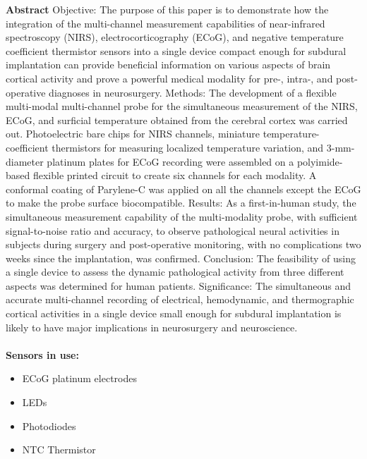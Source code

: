 \noindent
\textbf{Abstract} Objective: The purpose of this paper is to demonstrate how the integration of the multi-channel measurement capabilities of near-infrared spectroscopy (NIRS), electrocorticography (ECoG), and negative temperature coefficient thermistor sensors into a single device compact enough for subdural implantation can provide beneficial information on various aspects of brain cortical activity and prove a powerful medical modality for pre-, intra-, and post-operative diagnoses in neurosurgery. Methods: The development of a flexible multi-modal multi-channel probe for the simultaneous measurement of the NIRS, ECoG, and surficial temperature obtained from the cerebral cortex was carried out. Photoelectric bare chips for NIRS channels, miniature temperature-coefficient thermistors for measuring localized temperature variation, and 3-mm-diameter platinum plates for ECoG recording were assembled on a polyimide-based flexible printed circuit to create six channels for each modality. A conformal coating of Parylene-C was applied on all the channels except the ECoG to make the probe surface biocompatible. Results: As a first-in-human study, the simultaneous measurement capability of the multi-modality probe, with sufficient signal-to-noise ratio and accuracy, to observe pathological neural activities in subjects during surgery and post-operative monitoring, with no complications two weeks since the implantation, was confirmed. Conclusion: The feasibility of using a single device to assess the dynamic pathological activity from three different aspects was determined for human patients. Significance: The simultaneous and accurate multi-channel recording of electrical, hemodynamic, and thermographic cortical activities in a single device small enough for subdural implantation is likely to have major implications in neurosurgery and neuroscience. \\ \\

\noindent
\textbf{Sensors in use:}
\begin{itemize}
    \item ECoG platinum electrodes
    \item LEDs
    \item Photodiodes
    \item NTC Thermistor
    \\ \\
\end{itemize}


